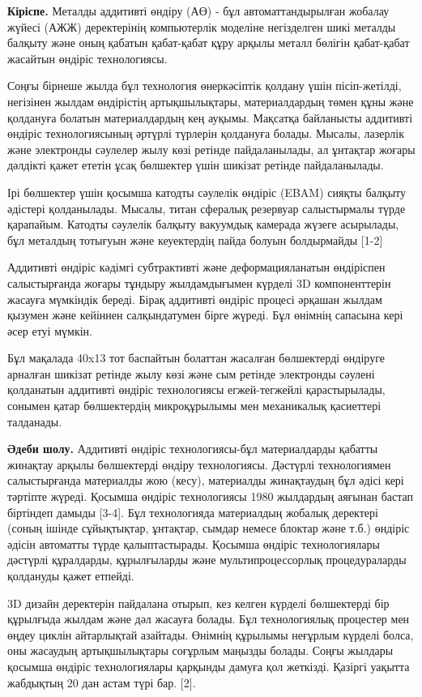 \begin{multicols}{2}
{\bfseries Кіріспе.} Металды аддитивті өндіру (АӨ) - бұл автоматтандырылған
жобалау жүйесі (АЖЖ) деректерінің компьютерлік моделіне негізделген шикі
металды балқыту және оның қабатын қабат-қабат құру арқылы металл бөлігін
қабат-қабат жасайтын өндіріс технологиясы.

Соңғы бірнеше жылда бұл технология өнеркәсіптік қолдану үшін
пісіп-жетілді, негізінен жылдам өндірістің артықшылықтары,
материалдардың төмен құны және қолдануға болатын материалдардың кең
ауқымы. Мақсатқа байланысты аддитивті өндіріс технологиясының әртүрлі
түрлерін қолдануға болады. Мысалы, лазерлік және электронды сәулелер
жылу көзі ретінде пайдаланылады, ал ұнтақтар жоғары дәлдікті қажет
ететін ұсақ бөлшектер үшін шикізат ретінде пайдаланылады.

Ірі бөлшектер үшін қосымша катодты сәулелік өндіріс (EBAM) сияқты
балқыту әдістері қолданылады. Мысалы, титан сфералық резервуар
салыстырмалы түрде қарапайым. Катодты сәулелік балқыту вакуумдық
камерада жүзеге асырылады, бұл металдың тотығуын және кеуектердің пайда
болуын болдырмайды {[}1-2{]}

Аддитивті өндіріс кәдімгі субтрактивті және деформацияланатын өндіріспен
салыстырғанда жоғары тұндыру жылдамдығымен күрделі 3D компоненттерін
жасауға мүмкіндік береді. Бірақ аддитивті өндіріс процесі әрқашан жылдам
қызумен және кейіннен салқындатумен бірге жүреді. Бұл өнімнің сапасына
кері әсер етуі мүмкін.

Бұл мақалада 40x13 тот баспайтын болаттан жасалған бөлшектерді өндіруге
арналған шикізат ретінде жылу көзі және сым ретінде электронды сәулені
қолданатын аддитивті өндіріс технологиясы егжей-тегжейлі қарастырылады,
сонымен қатар бөлшектердің микроқұрылымы мен механикалық қасиеттері
талданады.

{\bfseries Әдеби шолу.} Аддитивті өндіріс технологиясы-бұл материалдарды
қабатты жинақтау арқылы бөлшектерді өндіру технологиясы. Дәстүрлі
технологиямен салыстырғанда материалды жою (кесу), материалды
жинақтаудың бұл әдісі кері тәртіпте жүреді. Қосымша өндіріс технологиясы
1980 жылдардың аяғынан бастап біртіндеп дамыды {[}3-4{]}. Бұл
технологияда материалдың жобалық деректері (соның ішінде сұйықтықтар,
ұнтақтар, сымдар немесе блоктар және т.б.) өндіріс әдісін автоматты
түрде қалыптастырады. Қосымша өндіріс технологиялары дәстүрлі
құралдарды, құрылғыларды және мультипроцессорлық процедураларды
қолдануды қажет етпейді.

3D дизайн деректерін пайдалана отырып, кез келген күрделі бөлшектерді
бір құрылғыда жылдам және дәл жасауға болады. Бұл технологиялық
процестер мен өңдеу циклін айтарлықтай азайтады. Өнімнің құрылымы
неғұрлым күрделі болса, оны жасаудың артықшылықтары соғұрлым маңызды
болады. Соңғы жылдары қосымша өндіріс технологиялары қарқынды дамуға қол
жеткізді. Қазіргі уақытта жабдықтың 20 дан астам түрі бар. {[}2{]}.


\end{multicols}
